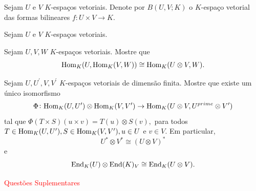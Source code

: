 \documentclass[11pt,a4paper]{article}
\begin{document}
\solucao{}
\begin{exercicio}
Sejam $U$ e $V$ $K$-espaços vetoriais. Denote por $B(U, V; K)$ o $K$-espaço vetorial das formas bilineares $f \colon U \times V \to K.$
\end{exercicio}
\solucao{}
\begin{exercicio}
Sejam $U$ e $V$ $K$-espaços vetoriais.
\end{exercicio}
\solucao{}
\begin{exercicio}
Sejam $U, V, W$ $K$-espaços vetoriais. Mostre que
\[
\mathrm{Hom }_K(U, \mathrm{Hom }_K(V,W)) \cong \mathrm{Hom }_K(U \otimes V,W).
\]
\end{exercicio}
\solucao{}
\begin{exercicio}
 Sejam $U, U^{\prime}, V, V^{\prime}$ $K$-espaços vetoriais de dimensão finita. Mostre que existe um único isomorfismo
 \[
 \Phi \colon \mathrm{Hom }_K(U, U^{\prime}) \otimes  \mathrm{Hom }_K(V, V^{\prime}) \to \mathrm{Hom }_K(U \otimes V, U^{prime} \otimes V^{\prime})
 \]
 tal que $\Phi(T \times S)(u \times v) = T(u) \otimes S(v),$ para todos $T \in \mathrm{Hom }_K(U, U^{\prime}), S \in \mathrm{Hom }_K(V, V^{\prime}), u \in U$ e $v \in V.$ Em particular, 
 \[
 U^{*} \otimes V^{*} \cong (U \otimes V)^{*}
 \]
 e
 \[
 \mathrm{End }_K(U) \otimes \mathrm{End }(K)_V \cong \mathrm{End }_K(U \otimes V).
 \]
\end{exercicio}
\solucao{}
   \textcolor{Red}{Questões Suplementares}

\solucao{}
\end{document}
